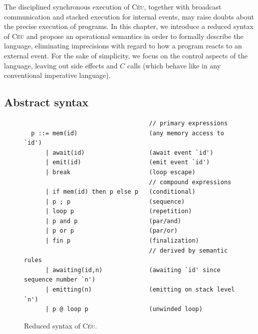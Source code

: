 \documentclass{sigplanconf}
\newcommand{\CEU}{\textsc{C\'{e}u}\xspace}
\newcommand{\1}{\;}
\newcommand{\2}{\;\;}
\newcommand{\3}{\;\;\;}
\newcommand{\5}{\;\;\;\;\;}
\begin{document}
The disciplined synchronous execution of \CEU, together with broadcast 
communication and stacked execution for internal events, may raise doubts about 
the precise execution of programs.
%
In this chapter, we introduce a reduced syntax of \CEU and propose an 
operational semantics in order to formally describe the language, eliminating 
imprecisions with regard to how a program reacts to an external event.
%
For the sake of simplicity, we focus on the control aspects of the language, 
leaving out side effects and $C$ calls (which behave like in any conventional 
imperative language).



\subsection{Abstract syntax}
\label{sec.sem.syntax}

\begin{figure}[h]
{\small
\begin{verbatim}
                                   // primary expressions
  p ::= mem(id)                    (any memory access to `id')
      | await(id)                  (await event `id')
      | emit(id)                   (emit event `id')
      | break                      (loop escape)
                                   // compound expressions
      | if mem(id) then p else p   (conditional)
      | p ; p                      (sequence)
      | loop p                     (repetition)
      | p and p                    (par/and)
      | p or p                     (par/or)
      | fin p                      (finalization)
                                   // derived by semantic rules
      | awaiting(id,n)             (awaiting `id' since sequence number `n')
      | emitting(n)                (emitting on stack level `n')
      | p @ loop p                 (unwinded loop)
\end{verbatim}
}%
\caption{
    Reduced syntax of \CEU.
\label{lst.formal.syntax}
}
\end{figure}
\end{document}
